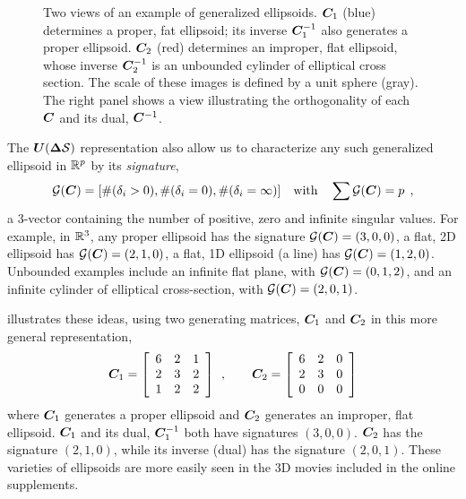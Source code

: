 \begin{figure}[htb]
\begin{minipage}[b]{.49\linewidth}
 \end{minipage}
\caption{Two views of an example of generalized ellipsoids.  $\bm{C}_1$  (blue) determines a proper, fat ellipsoid;
its inverse $\bm{C}_1^{-1}$ also generates a proper ellipsoid. $\bm{C}_2$  (red) determines an improper, flat ellipsoid,
whose inverse $\bm{C}_2^{-1}$ is an unbounded cylinder of elliptical cross section.  The scale of these images is defined
by a unit sphere (gray). The right panel shows a view illustrating the orthogonality of each $\bm{C}$ and its dual,  $\bm{C}^{-1}$.
}
\label{fig:gell3d}
\end{figure}

The $\bm{U} (\bm{\Delta} \mathcal{S})$ representation also allow us to characterize any such
generalized ellipsoid in $\mathbb{R}^{p}$ by its \emph{signature},
\begin{equation}
 \mathcal{G}(\bm{C}) = [ \#(\delta_i >0), \#(\delta_i =0), \#(\delta_i =\infty) ] \quad \mbox{with} \quad \sum \mathcal{G}(\bm{C}) = p\:\: ,
\end{equation}
a 3-vector containing the number of positive, zero and infinite singular values.  For example, in $\mathbb{R}^{3}$, any proper ellipsoid has
the signature $\mathcal{G}(\bm{C})=(3, 0, 0)$, a flat, 2D ellipsoid has $\mathcal{G}(\bm{C})=(2, 1, 0)$, a flat, 1D ellipsoid (a line)
has $\mathcal{G}(\bm{C})=(1, 2, 0)$. Unbounded examples include an infinite flat plane, with $\mathcal{G}(\bm{C})=(0, 1, 2)$,
and an infinite cylinder of elliptical cross-section, with $\mathcal{G}(\bm{C})=(2, 0, 1)$.


 illustrates these ideas, using two generating matrices, $\bm{C}_1$ and $\bm{C}_2$ in this more
general representation,
\[
\bm{C}_1 = \left[
\begin{array}{ccc}
 6 & 2 & 1  \\
 2 & 3 & 2  \\
 1 & 2 & 2
\end{array}
\right]
\:\: , \quad\quad
\bm{C}_2 = \left[
\begin{array}{ccc}
 6 & 2 & 0  \\
 2 & 3 & 0  \\
 0 & 0 & 0
\end{array}
\right]
\]
where $\bm{C}_1$ generates a proper ellipsoid and $\bm{C}_2$ generates an improper, flat ellipsoid.
 $\bm{C}_1$ and its dual,  $\bm{C}_1^{-1}$ both have signatures $(3, 0, 0)$.
$\bm{C}_2$ has the signature $(2, 1, 0)$, while its inverse (dual) has the signature $(2, 0, 1)$.
These varieties of ellipsoids are more easily seen in the 3D movies included in the online supplements.

